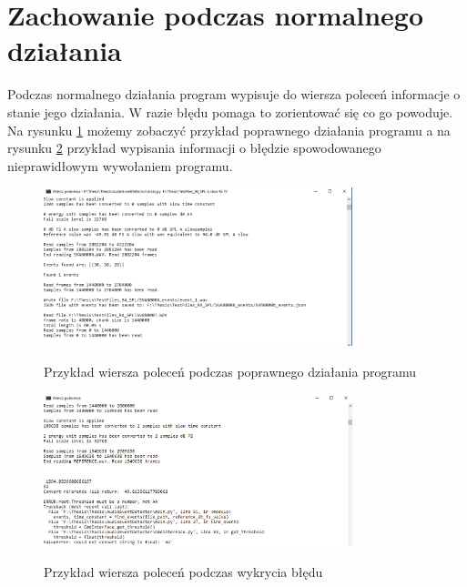 \documentclass[eng,printmode]{mgr}
\begin{document}
\section{Zachowanie podczas normalnego działania}
Podczas normalnego działania program wypisuje do wiersza poleceń informacje o stanie jego działania. W razie błędu pomaga to zorientować się co go powoduje. Na rysunku \ref{poprawne_dzialanie} możemy zobaczyć przykład poprawnego działania programu a na rysunku \ref{blad} przykład wypisania informacji o błędzie spowodowanego nieprawidłowym wywołaniem programu. 

\begin{figure}[hbtp]
\caption{Przykład wiersza poleceń podczas poprawnego działania programu}
\centering
\includegraphics[width=0.8\textwidth]{poprawne_dzialanie.PNG}
\label{poprawne_dzialanie}
\end{figure}

\begin{figure}[hbtp]
\caption{Przykład wiersza poleceń podczas wykrycia błędu}
\centering
\includegraphics[width=0.8\textwidth]{blad.PNG}
\label{blad}
\end{figure}
\end{document}
